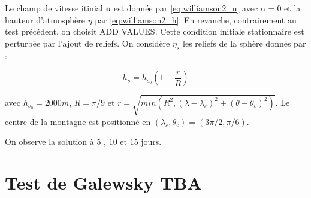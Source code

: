 Le champ de vitesse itinial $\mathbf{u}$ est donnée par \eqref{eq:williamson2_u} avec $\alpha=0$ et la hauteur d'atmosphère $\eta$ par \eqref{eq:williamson2_h}. En revanche, contrairement au test précédent, on choisit ADD VALUES.
Cette condition initiale stationnaire est perturbée par l'ajout de reliefs. On considère $\eta_s$ les reliefs de la sphère donnés par :

\begin{equation}
h_s = h_{s_0} \left( 1 - \dfrac{r}{R} \right)
\end{equation}

avec $h_{s_0}=2000m$, $R=\pi/9$ et $r = \sqrt{min\left( R^2, \left( \lambda-\lambda_c \right)^2 + \left( \theta-\theta_c \right)^2 \right)}$.
Le centre de la montagne est positionné en $(\lambda_c, \theta_c) = (3\pi/2, \pi/6)$.

On observe la solution à $5$ , $10$ et $15$ jours.

\section{Test de Galewsky TBA}